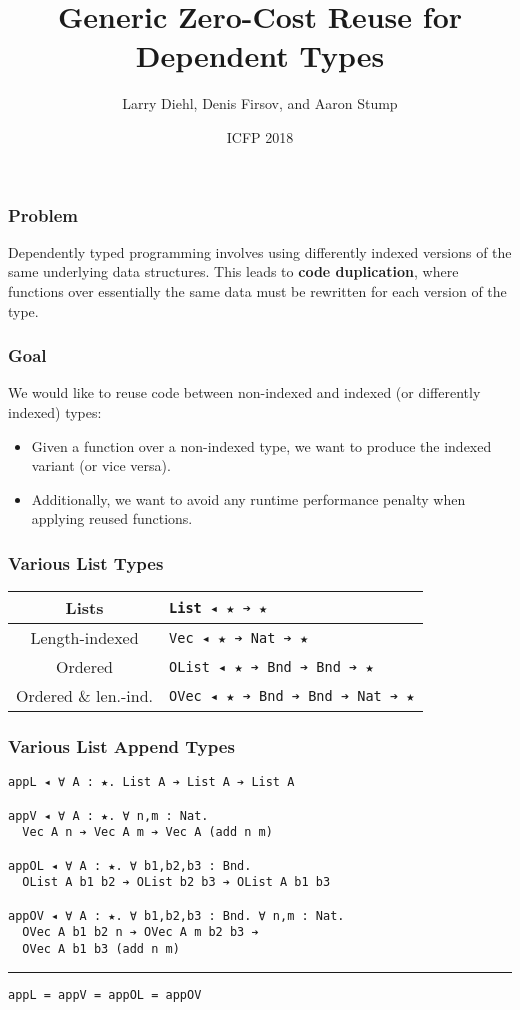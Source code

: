 \documentclass[mathserif,usenames,dvipsnames]{beamer}
\title{Generic Zero-Cost Reuse for Dependent Types}
\author{Larry Diehl, Denis Firsov, and Aaron Stump}
\institute{University of Iowa}
\date[September 26, 2018]
{ICFP 2018}
\begin{document}
\frame{\titlepage}

\begin{frame}
\frametitle{Problem}

Dependently typed programming involves using differently indexed
versions of the same underlying data structures. This leads to
\textbf{code duplication}, where functions over essentially the same
data must be rewritten for each version of the type.

\end{frame}

\begin{frame}
\frametitle{Goal}

We would like to reuse code between non-indexed and indexed (or
differently indexed) types:

\begin{itemize}
\item Given a function over a non-indexed type,
  we want to produce the indexed variant (or vice versa).
\item Additionally, we want to avoid any runtime performance penalty
  when applying reused functions.
\end{itemize}

\end{frame}

\begin{frame}
\frametitle{Various List Types}

\begin{center}
\begin{tabular}{ |c||l| } 
 \hline
 Lists & \texttt{List ◂ ★ ➔ ★} \\
 \hline
 Length-indexed & \texttt{Vec ◂ ★ ➔ Nat ➔ ★} \\
 \hline
 Ordered & \texttt{OList ◂ ★ ➔ Bnd ➔ Bnd ➔ ★} \\ 
 \hline
 Ordered \& len.-ind. & \texttt{OVec ◂ ★ ➔ Bnd ➔ Bnd ➔ Nat ➔ ★} \\ 
 \hline
\end{tabular}
\end{center}

\end{frame}

\begin{frame}[fragile]
\frametitle{Various List Append Types}

\begin{verbatim}
appL ◂ ∀ A : ★. List A ➔ List A ➔ List A

appV ◂ ∀ A : ★. ∀ n,m : Nat. 
  Vec A n ➔ Vec A m ➔ Vec A (add n m)

appOL ◂ ∀ A : ★. ∀ b1,b2,b3 : Bnd. 
  OList A b1 b2 ➔ OList b2 b3 ➔ OList A b1 b3

appOV ◂ ∀ A : ★. ∀ b1,b2,b3 : Bnd. ∀ n,m : Nat.
  OVec A b1 b2 n ➔ OVec A m b2 b3 ➔ 
  OVec A b1 b3 (add n m)
\end{verbatim}

\noindent\rule{\textwidth}{1pt}

\begin{verbatim}
appL = appV = appOL = appOV
\end{verbatim}

\end{frame}
\end{document}

